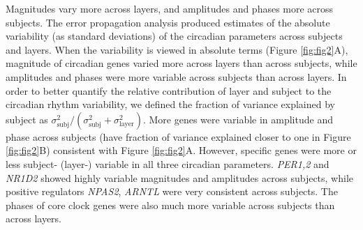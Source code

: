 Magnitudes vary more across layers, and amplitudes and phases more across subjects. The error propagation analysis produced estimates of the absolute variability (as standard deviations) of the circadian parameters across subjects and layers. When the variability is viewed in absolute terms (Figure \ref{fig:fig2}A), magnitude of circadian genes varied more across layers than across subjects, while amplitudes and phases were more variable across subjects than across layers. In order to better quantify the relative contribution of layer and subject to the circadian rhythm variability, we defined the fraction of variance explained by subject as $\sigma^2_\textrm{subj}/(\sigma^2_\textrm{subj} + \sigma^2_\textrm{layer})$. More genes were variable in amplitude and phase across subjects (have fraction of variance explained closer to one in Figure \ref{fig:fig2}B) consistent with Figure \ref{fig:fig2}A. However, specific genes were more or less subject- (layer-) variable in all three circadian parameters. \textit{PER1,2} and \textit{NR1D2} showed highly variable magnitudes and amplitudes across subjects, while positive regulators \textit{NPAS2}, \textit{ARNTL} were very consistent across subjects. The phases of core clock genes were also much more variable across subjects than across layers.%
